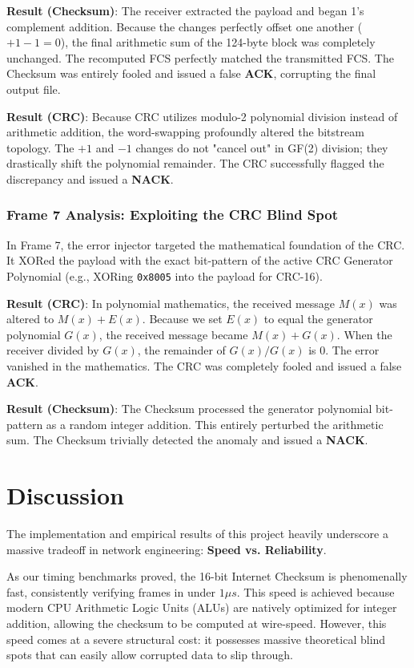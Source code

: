 \documentclass[12pt, a4paper]{article}
\begin{document}
\textbf{Result (Checksum)}: The receiver extracted the payload and began 1's complement addition. Because the changes perfectly offset one another ($+1 -1 = 0$), the final arithmetic sum of the 124-byte block was completely unchanged. The recomputed FCS perfectly matched the transmitted FCS. The Checksum was entirely fooled and issued a false \textbf{ACK}, corrupting the final output file.

\textbf{Result (CRC)}: Because CRC utilizes modulo-2 polynomial division instead of arithmetic addition, the word-swapping profoundly altered the bitstream topology. The $+1$ and $-1$ changes do not "cancel out" in GF(2) division; they drastically shift the polynomial remainder. The CRC successfully flagged the discrepancy and issued a \textbf{NACK}.

\subsubsection{Frame 7 Analysis: Exploiting the CRC Blind Spot}
In Frame 7, the error injector targeted the mathematical foundation of the CRC. It XORed the payload with the exact bit-pattern of the active CRC Generator Polynomial (e.g., XORing \texttt{0x8005} into the payload for CRC-16).

\textbf{Result (CRC)}: In polynomial mathematics, the received message $M(x)$ was altered to $M(x) + E(x)$. Because we set $E(x)$ to equal the generator polynomial $G(x)$, the received message became $M(x) + G(x)$. When the receiver divided by $G(x)$, the remainder of $G(x) / G(x)$ is $0$. The error vanished in the mathematics. The CRC was completely fooled and issued a false \textbf{ACK}.

\textbf{Result (Checksum)}: The Checksum processed the generator polynomial bit-pattern as a random integer addition. This entirely perturbed the arithmetic sum. The Checksum trivially detected the anomaly and issued a \textbf{NACK}.

\section{Discussion}
The implementation and empirical results of this project heavily underscore a massive tradeoff in network engineering: \textbf{Speed vs. Reliability}.

As our timing benchmarks proved, the 16-bit Internet Checksum is phenomenally fast, consistently verifying frames in under $1 \mu s$. This speed is achieved because modern CPU Arithmetic Logic Units (ALUs) are natively optimized for integer addition, allowing the checksum to be computed at wire-speed. However, this speed comes at a severe structural cost: it possesses massive theoretical blind spots that can easily allow corrupted data to slip through.
\end{document}
